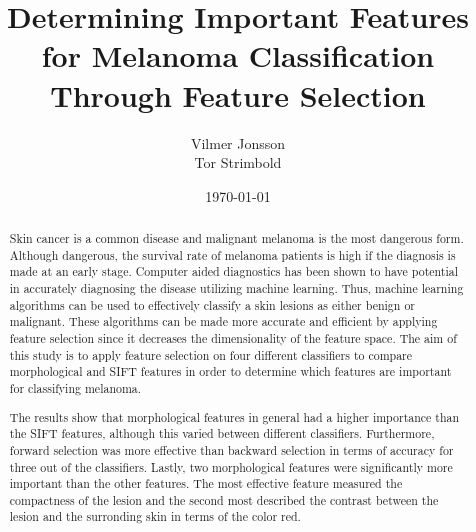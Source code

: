 \documentclass{kththesis}
\title{Determining Important Features for Melanoma Classification Through Feature Selection}
\author{Vilmer Jonsson \\ Tor Strimbold}
\date{\today}
\begin{document}
\frontmatter

\titlepage

\begin{abstract}
  Skin cancer is a common disease and malignant melanoma is the most dangerous form. Although dangerous, the survival rate of melanoma patients is high if the diagnosis is made at an early stage. Computer aided diagnostics has been shown to have potential in accurately diagnosing the disease utilizing machine learning. Thus, machine learning algorithms can be used to effectively classify a skin lesions as either benign or malignant. These algorithms can be made more accurate and efficient by applying feature selection since it decreases the dimensionality of the feature space. The aim of this study is to apply feature selection on four different classifiers to compare morphological and SIFT features in order to determine which features are important for classifying melanoma.
  
  The results show that morphological features in general had a higher importance than the SIFT features, although this varied between different classifiers. Furthermore, forward selection was more effective than backward selection in terms of accuracy for three out of the classifiers. Lastly, two morphological features were significantly more important than the other features. The most effective feature measured the compactness of the lesion and the second most described the contrast between the lesion and the surronding skin in terms of the color red.
\end{abstract}
\end{document}
